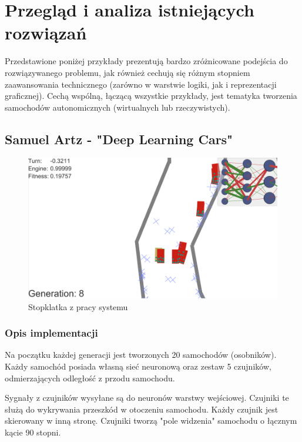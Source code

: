 \chapter{Przegląd i analiza istniejących rozwiązań}

Przedstawione poniżej przykłady prezentują bardzo zróżnicowane podejścia do rozwiązywanego problemu, jak również cechują się różnym stopniem zaawansowania technicznego (zarówno w warstwie logiki, jak i reprezentacji graficznej).
Cechą wspólną, łączącą wszystkie przykłady, jest tematyka tworzenia
samochodów autonomicznych (wirtualnych lub rzeczywistych).

\section{
	Samuel Artz - "Deep Learning Cars"
	\cite{artz:deepLearningCars:blog}
	\cite{artz:deepLearningCars:github}
}

\begin{figure}[h]
\begin{center}
\includegraphics[width=16cm]{resources/figures/samuelArtzDeepCars.png}
\caption{Stopklatka z pracy systemu}
\end{center}
\end{figure}
\label{SamuelArtzDeepLearningCars}

\subsection{Opis implementacji}
Na początku każdej generacji jest tworzonych 20 samochodów (osobników). \\
Każdy samochód posiada własną sieć neuronową oraz zestaw 5 czujników, odmierzających odległość z przodu samochodu.

Sygnały z czujników wysyłane są do neuronów warstwy wejściowej.
Czujniki te służą do wykrywania przeszkód w otoczeniu samochodu.
Każdy czujnik jest skierowany w inną stronę.
Czujniki tworzą "pole widzenia" samochodu o łącznym kącie 90 stopni.

